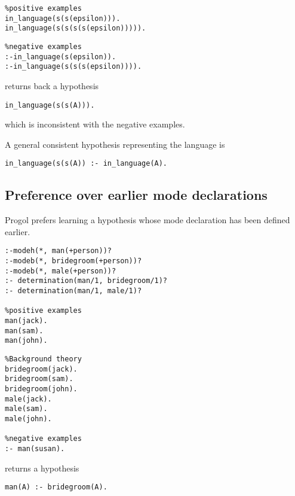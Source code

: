 \begin{minipage}[t]{.50\textwidth}
\begin{lstlisting}
%positive examples
in_language(s(s(epsilon))).
in_language(s(s(s(s(epsilon))))).
\end{lstlisting}
\end{minipage}
\begin{minipage}[t]{.20\textwidth}
\begin{lstlisting}
%negative examples
:-in_language(s(epsilon)).
:-in_language(s(s(s(epsilon)))).
\end{lstlisting}
\end{minipage}

returns back a hypothesis
\begin{lstlisting}
in_language(s(s(A))).
\end{lstlisting}
which is inconsistent with the negative examples.

A general consistent hypothesis representing the language is
\begin{lstlisting}
in_language(s(s(A)) :- in_language(A).
\end{lstlisting}

\subsection{Preference over earlier mode declarations}
Progol prefers learning a hypothesis whose mode declaration has been defined earlier.

\begin{minipage}[t]{.60\textwidth}
\begin{lstlisting}
:-modeh(*, man(+person))?
:-modeb(*, bridegroom(+person))?
:-modeb(*, male(+person))?
:- determination(man/1, bridegroom/1)?
:- determination(man/1, male/1)?

%positive examples
man(jack).
man(sam).
man(john).
\end{lstlisting}
\end{minipage}
\begin{minipage}[t]{.20\textwidth}
\begin{lstlisting}
%Background theory
bridegroom(jack).
bridegroom(sam).
bridegroom(john).
male(jack).
male(sam).
male(john).

%negative examples
:- man(susan).
\end{lstlisting}
\end{minipage}

returns a hypothesis
\begin{lstlisting}
man(A) :- bridegroom(A).
\end{lstlisting}

